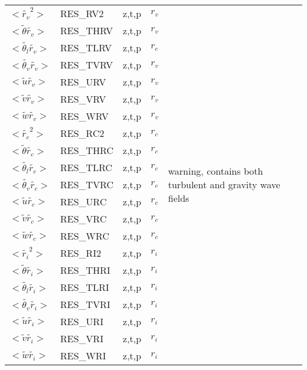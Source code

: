 \begin{center}
\begin{makeimage}
\begin{tabular}{||p{6cm}|>{\centering}p{2.5cm}|>{\centering}p{1.5cm}|>{\centering}p{0.5cm}|p{5cm }||}
\hline
\hline
$<\tilde{r_v}^2>$ & RES\_RV2 &z,t,p &   $r_v$ &\multirow{25}{5cm}{warning, contains both turbulent and gravity wave fields }\\
\cline{1-4}
$<\tilde{\theta}\tilde{r_v}>$ & RES\_THRV &z,t,p &   $r_v$ &\\
\cline{1-4}
$<\tilde{\theta_l}\tilde{r_v}>$ & RES\_TLRV &z,t,p &   $r_c$ &\\
\cline{1-4}
$<\tilde{\theta_v}\tilde{r_v}>$ & RES\_TVRV &z,t,p &  $r_v$ &\\
\cline{1-4}
$<\tilde{u}\tilde{r_v}>$ & RES\_URV &z,t,p &  $r_v$  &\\
\cline{1-4}
$<\tilde{v}\tilde{r_v}>$ & RES\_VRV &z,t,p &   $r_v$ &\\
\cline{1-4}
$<\tilde{w}\tilde{r_v}>$ & RES\_WRV &z,t,p &   $r_v$ &\\
\cline{1-4}
$<\tilde{r_c}^2>$ & RES\_RC2 &z,t,p &   $r_c$ &\\
\cline{1-4}
$<\tilde{\theta}\tilde{r_c}>$ & RES\_THRC &z,t,p &   $r_c$ &\\
\cline{1-4}
$<\tilde{\theta_l}\tilde{r_c}>$ & RES\_TLRC &z,t,p &   $r_c$ &\\
\cline{1-4}
$<\tilde{\theta_v}\tilde{r_c}>$ & RES\_TVRC &z,t,p &   $r_c$ &\\
\cline{1-4}
$<\tilde{u}\tilde{r_c}>$ & RES\_URC &z,t,p &  $r_c$  &\\
\cline{1-4}
$<\tilde{v}\tilde{r_c}>$ & RES\_VRC &z,t,p &   $r_c$ &\\
\cline{1-4}
$<\tilde{w}\tilde{r_c}>$ & RES\_WRC &z,t,p &   $r_c$ &\\
\cline{1-4}
$<\tilde{r_i}^2>$ & RES\_RI2 &z,t,p &   $r_i$ &\\
\cline{1-4}
$<\tilde{\theta}\tilde{r_i}>$ & RES\_THRI &z,t,p &   $r_i$ &\\
\cline{1-4}
$<\tilde{\theta_l}\tilde{r_i}>$ & RES\_TLRI &z,t,p &   $r_i$ &\\
\cline{1-4}
$<\tilde{\theta_v}\tilde{r_i}>$ & RES\_TVRI &z,t,p &   $r_i$ &\\
\cline{1-4}
$<\tilde{u}\tilde{r_i}>$ & RES\_URI &z,t,p &  $r_i$  &\\
\cline{1-4}
$<\tilde{v}\tilde{r_i}>$ & RES\_VRI &z,t,p &   $r_i$ &\\
\cline{1-4}
$<\tilde{w}\tilde{r_i}>$ & RES\_WRI &z,t,p &   $r_i$ &\\

\end{tabular}
\end{makeimage}
\end{center}
